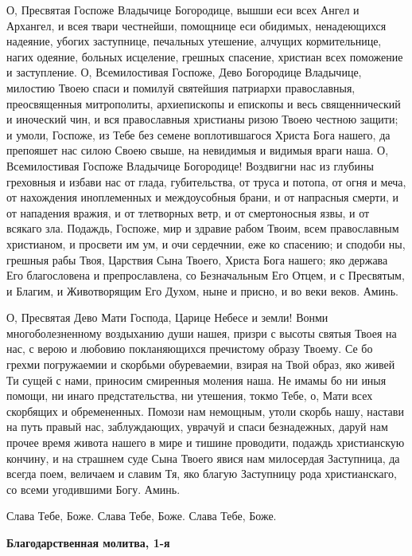 О, Пресвятая Госпоже Владычице Богородице, вышши еси всех Ангел и Архангел, и всея твари честнейши, помощнице еси обидимых, ненадеющихся надеяние, убогих заступнице, печальных утешение, алчущих кормительнице, нагих одеяние, больных исцеление, грешных спасение, христиан всех поможение и заступление. О, Всемилостивая Госпоже, Дево Богородице Владычице, милостию Твоею спаси и помилуй святейшия патриархи православныя, преосвященныя митрополиты, архиепископы и епископы и весь священнический и иноческий чин, и вся православныя христианы ризою Твоею честною защити; и умоли, Госпоже, из Тебе без семене воплотившагося Христа Бога нашего, да препояшет нас силою Своею свыше, на невидимыя и видимыя враги наша. О, Всемилостивая Госпоже Владычице Богородице! Воздвигни нас из глубины греховныя и избави нас от глада, губительства, от труса и потопа, от огня и меча, от нахождения иноплеменных и междоусобныя брани, и от напрасныя смерти, и от нападения вражия, и от тлетворных ветр, и от смертоносныя язвы, и от всякаго зла. Подаждь, Госпоже, мир и здравие рабом Твоим, всем православным христианом, и просвети им ум, и очи сердечнии, еже ко спасению; и сподоби ны, грешныя рабы Твоя, Царствия Сына Твоего, Христа Бога нашего; яко держава Его благословена и препрославлена, со Безначальным Его Отцем, и с Пресвятым, и Благим, и Животворящим Его Духом, ныне и присно, и во веки веков. Аминь.


О, Пресвятая Дево Мати Господа, Царице Небесе и земли! Вонми многоболезненному воздыханию души нашея, призри с высоты святыя Твоея на нас, с верою и любовию покланяющихся пречистому образу Твоему. Се бо грехми погружаемии и скорбьми обуреваемии, взирая на Твой образ, яко живей Ти сущей с нами, приносим смиренныя моления наша. Не имамы бо ни иныя помощи, ни инаго предстательства, ни утешения, токмо Тебе, о, Мати всех скорбящих и обремененных. Помози нам немощным, утоли скорбь нашу, настави на путь правый нас, заблуждающих, уврачуй и спаси безнадежных, даруй нам прочее время живота нашего в мире и тишине проводити, подаждь христианскую кончину, и на страшнем суде Сына Твоего явися нам милосердая Заступница, да всегда поем, величаем и славим Тя, яко благую Заступницу рода христианскаго, со всеми угодившими Богу. Аминь.\mychapterending

 
Слава Тебе, Боже. Слава Тебе, Боже. Слава Тебе, Боже.


\medskip
\bfseries Благодарственная молитва, 1-я\normalfont{}\nopagebreak


